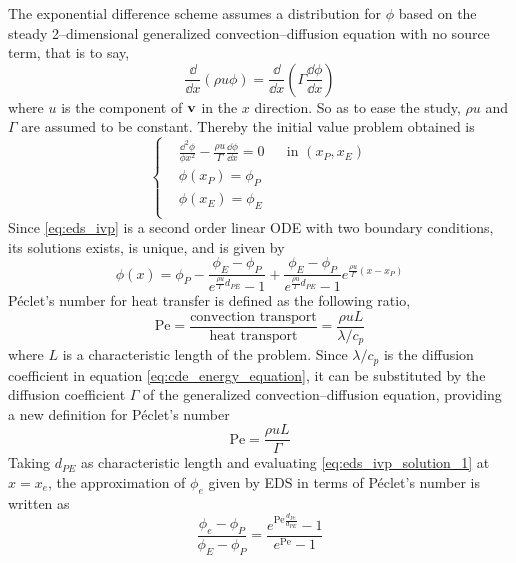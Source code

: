 The exponential difference scheme assumes a distribution for $\phi$ based on the steady 2--dimensional generalized convection--diffusion equation with no source term, that is to say,
\begin{equation}
	\frac{\dd}{\dd{x}} (\rho u \phi) = \frac{\dd}{\dd{x}} \left( \Gamma \frac{\dd{\phi}}{\dd{x}} \right)
\end{equation}
where $u$ is the component of $\vb{v}$ in the $x$ direction. So as to ease the study, $\rho u$ and $\Gamma$ are assumed to be constant. Thereby the initial value problem obtained is
\begin{equation} \label{eq:eds_ivp}
	\left\{
	\begin{aligned}
		&\frac{\dd^2 \phi}{\phi{x^2}} - \frac{\rho u}{\Gamma} \frac{\dd{\phi}}{\dd{x}} = 0 & &\text{in } (x_P, x_E) \\
		&\phi(x_P) = \phi_P \\
		&\phi(x_E) = \phi_E \\
	\end{aligned}
	\right.
\end{equation}
Since \eqref{eq:eds_ivp} is a second order linear ODE with two boundary conditions, its solutions exists, is unique, and is given by
\begin{equation} \label{eq:eds_ivp_solution_1}
	\phi(x) = 
	\phi_P - 
	\frac{\phi_E - \phi_P}{e^{\frac{\rho u}{\Gamma} d_{PE}} - 1} + 
	\frac{\phi_E - \phi_P}{e^{\frac{\rho u}{\Gamma} d_{PE}} - 1} e^{\frac{\rho u}{\Gamma} (x - x_P)}
\end{equation}
Péclet's number for heat transfer is defined as the following ratio,
\begin{equation}
	\mathrm{Pe} = 
	\frac{\text{convection transport}}{\text{heat transport}} = 
	\frac{\rho u L}{\lambda / c_p}
\end{equation}
where $L$ is a characteristic length of the problem. Since $\lambda / c_p$ is the diffusion coefficient in equation \eqref{eq:cde_energy_equation}, it can be substituted by the diffusion coefficient $\Gamma$ of the generalized convection--diffusion equation, providing a new definition for Péclet's number 
\begin{equation}
	\mathrm{Pe} = 
	\frac{\rho u L}{\Gamma}
\end{equation}
Taking $d_{PE}$ as characteristic length and evaluating \eqref{eq:eds_ivp_solution_1} at $x = x_e$, the approximation of $\phi_e$ given by EDS in terms of Péclet's number is written as
\begin{equation}
	\frac{\phi_e - \phi_P}{\phi_E - \phi_P} =
	\frac{e^{\mathrm{Pe} \frac{d_{Pe}}{d_{PE}}} - 1}{e^{\mathrm{Pe}} - 1} 
\end{equation}


